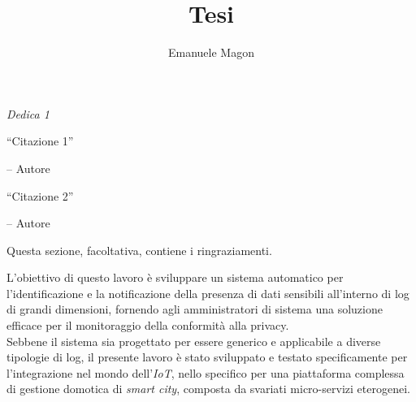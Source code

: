 \documentclass[12pt]{report}
\title{Tesi}
\author{Emanuele Magon}
\begin{document}
\makecenteredfrontpage

%
%

{\raggedleft \large \sl Dedica 1\\

    \vspace{2cm}

    ``Citazione 1''

    \bigskip

    \--- Autore\\

    \vspace{2cm}

    ``Citazione 2''

    \bigskip

    \--- Autore\\}

\clearpage
\beforepreface

%
%


%
%

Questa sezione, facoltativa, contiene i ringraziamenti.

%
%

\afterpreface



%
%


L'obiettivo di questo lavoro è sviluppare un sistema automatico per l'identificazione e la notificazione della presenza di dati sensibili all'interno di log di grandi dimensioni, fornendo agli amministratori di sistema una soluzione efficace per il monitoraggio della conformità alla privacy. \\
Sebbene il sistema sia progettato per essere generico e applicabile a diverse tipologie di log, il presente lavoro è stato sviluppato e testato specificamente per l'integrazione nel mondo dell'\textit{IoT}, nello specifico per una piattaforma complessa di gestione domotica di \textit{smart city}, composta da svariati micro-servizi eterogenei.
\end{document}
